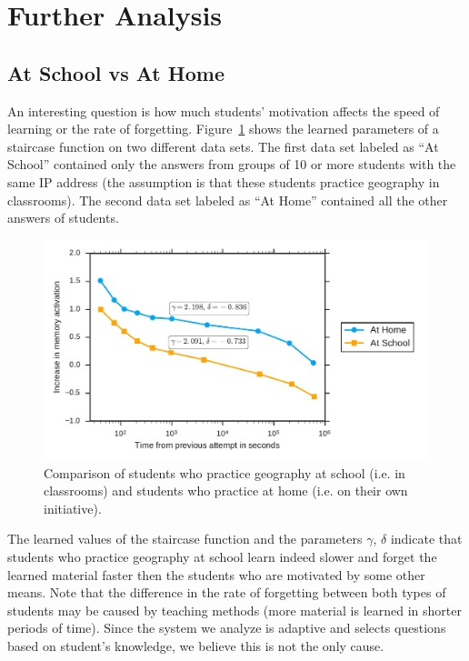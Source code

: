 \section{Further Analysis}
\label{further-analysis}

\subsection{At School vs At Home}

An interesting question is how much students' motivation affects the speed of learning or the rate of forgetting. Figure~\ref{fig:at-home-vs-at-school} shows the learned parameters of a staircase function on two different data sets. The first data set labeled as ``At School'' contained only the answers from groups of 10 or more students with the same IP address (the assumption is that these students practice geography in classrooms). The second data set labeled as ``At Home'' contained all the other answers of students.

\begin{figure}[htbp]
  \centering
  \includegraphics[width=\textwidth]{img/at-home-vs-at-school}
  \caption{Comparison of students who practice geography at school (i.e. in classrooms) and students who practice at home (i.e. on their own initiative).}
  \label{fig:at-home-vs-at-school}
\end{figure}

The learned values of the staircase function and the parameters $\gamma$, $\delta$ indicate that students who practice geography at school learn indeed slower and forget the learned material faster then the students who are motivated by some other means. Note that the difference in the rate of forgetting between both types of students may be caused by teaching methods (more material is learned in shorter periods of time). Since the system we analyze is adaptive and selects questions based on student's knowledge, we believe this is not the only cause.


